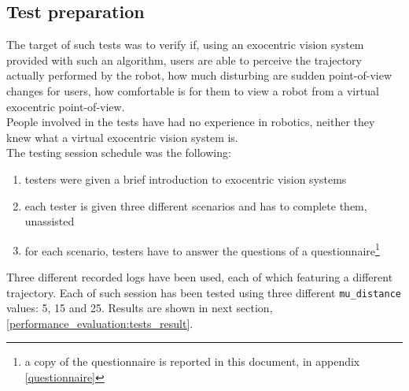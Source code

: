 \subsection{Test preparation}
\label{performance_evaluation:testintro:testpreparation}

The target of such tests was to verify  if, using 
an exocentric vision system provided with such an algorithm, 
users are able to perceive the trajectory actually 
performed by the robot,  how much disturbing are 
sudden point-of-view changes for users,  how 
comfortable is for them to view a robot from a 
virtual exocentric point-of-view.
\\
People involved in the tests have had no experience in 
robotics, neither they knew what a virtual exocentric 
vision system is.
\\
The testing session schedule was the following:
\begin{enumerate}
  \item testers were given a brief introduction to exocentric vision systems
  \item each tester is given three different scenarios and has to 
    complete them, unassisted
  \item for each scenario, testers have to answer the questions 
    of a questionnaire\footnote{a copy of the questionnaire is 
      reported in this document, in appendix \ref{questionnaire}}
\end{enumerate}

Three different recorded logs have been used, each of which featuring 
a different trajectory. Each of such session has been tested
using three different \texttt{mu\_distance} values: 5, 15 and 25.
Results are shown in next section,
\ref{performance_evaluation:tests_result}.
